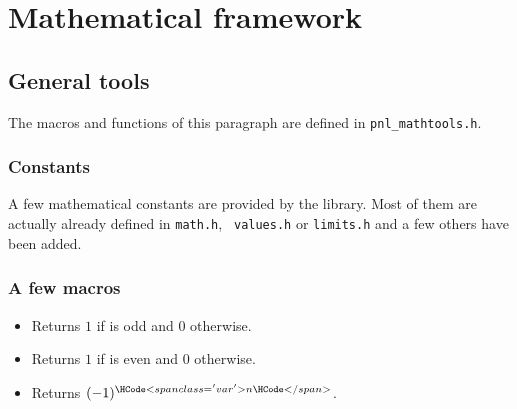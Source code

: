 \section{Mathematical framework}

\subsection{General tools}

The macros and functions of this paragraph are defined in \verb!pnl_mathtools.h!.

\subsubsection{Constants} A few mathematical constants are provided by the
library. Most of them are actually already defined in {\tt math.h}, {\tt
  values.h} or {\tt limits.h} and a few others have been added.
\begin{describeconst}
\end{describeconst}

\subsubsection{A few macros}
\begin{itemize}
\item {}
  \sshortdescribe Returns $1$ if  is odd and $0$ otherwise.
\item {}
  \sshortdescribe Returns $1$ if  is even and $0$ otherwise.
\item {}
  \sshortdescribe Returns $(-1)^{\var{n}}$.
\end{itemize}

